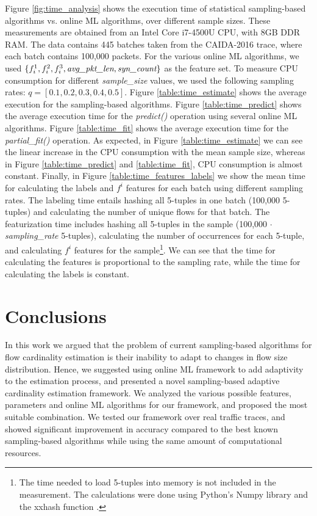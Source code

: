 		Figure \ref{fig:time_analysis} shows the execution time of statistical sampling-based algorithms vs. online
		ML algorithms, over different sample sizes. These measurements are obtained from an Intel Core i7-4500U CPU,
		with 8GB DDR RAM. The data contains 445 batches taken from the CAIDA-2016 trace, where each batch contains
		100,000 packets. For the various online ML algorithms, we used $\{f_i^1, f_i^2, f_i^3, \emph{avg\_pkt\_len},
		\emph{syn\_count}\}$ as the feature set. To measure CPU consumption for different \emph{sample\_size} values,
		we used the following sampling rates: $q = [0.1, 0.2, 0.3, 0.4, 0.5]$. Figure \ref{table:time_estimate}
		shows the average execution for the sampling-based algorithms.  Figure \ref{table:time_predict} shows
		the average execution time for the \emph{predict()} operation using several online ML algorithms. Figure
		\ref{table:time_fit} shows the average execution time for the \emph{partial\_fit()} operation. As expected, in
		Figure \ref{table:time_estimate} we can see the linear increase in the CPU consumption with the mean sample
		size, whereas in Figure \ref{table:time_predict} and \ref{table:time_fit}, CPU consumption is almost constant.
        Finally, in Figure \ref{table:time_features_labels} we show the mean time for calculating the labels and $f^i$ features for each batch using different sampling rates. The labeling time entails hashing all 5-tuples in one batch (100,000 5-tuples) and calculating the number of unique flows for that batch. The featurization time includes hashing all 5-tuples in the sample (100,000 $\cdot$ \emph{sampling\_rate} 5-tuples), calculating the number of occurrences for each 5-tuple, and calculating $f^i$ features for the sample\footnote{The time needed to load 5-tuples into memory is not included in the measurement. The calculations were done using Python's Numpy library \cite{van2011numpy} and the xxhash function \cite{collet2016xxhash}.}. We can see that the time for calculating the features is proportional to the sampling rate, while the time for calculating the labels is constant.

\section{Conclusions} \label{sec:conclusions}
	
		In this work we argued that the problem of current sampling-based algorithms for flow cardinality estimation is their inability to adapt to changes in flow size distribution. Hence, we suggested using online ML framework to add adaptivity to the estimation process, and presented a novel sampling-based adaptive cardinality estimation framework. We analyzed the various possible features, parameters and online ML algorithms for our framework, and proposed the most suitable combination. We tested our framework over real traffic traces, and showed significant improvement in accuracy compared to the best known sampling-based algorithms while using the same amount of computational resources.
	
